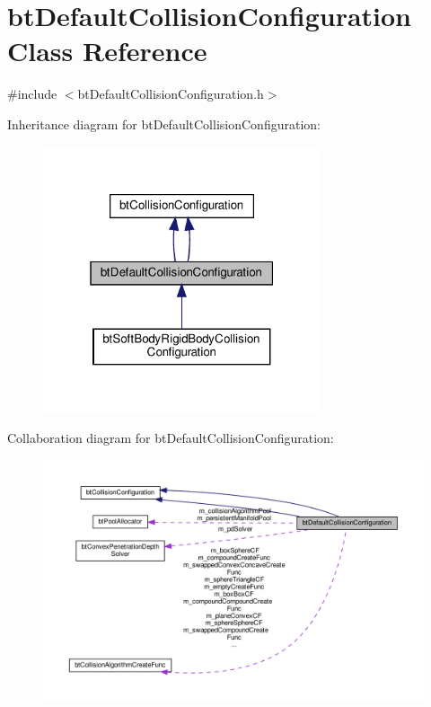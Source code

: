 \hypertarget{classbtDefaultCollisionConfiguration}{}\section{bt\+Default\+Collision\+Configuration Class Reference}
\label{classbtDefaultCollisionConfiguration}


{\ttfamily \#include $<$bt\+Default\+Collision\+Configuration.\+h$>$}



Inheritance diagram for bt\+Default\+Collision\+Configuration\+:
\nopagebreak
\begin{figure}[H]
\begin{center}
\leavevmode
\includegraphics[width=232pt]{classbtDefaultCollisionConfiguration__inherit__graph}
\end{center}
\end{figure}


Collaboration diagram for bt\+Default\+Collision\+Configuration\+:
\nopagebreak
\begin{figure}[H]
\begin{center}
\leavevmode
\includegraphics[width=350pt]{classbtDefaultCollisionConfiguration__coll__graph}
\end{center}
\end{figure}
